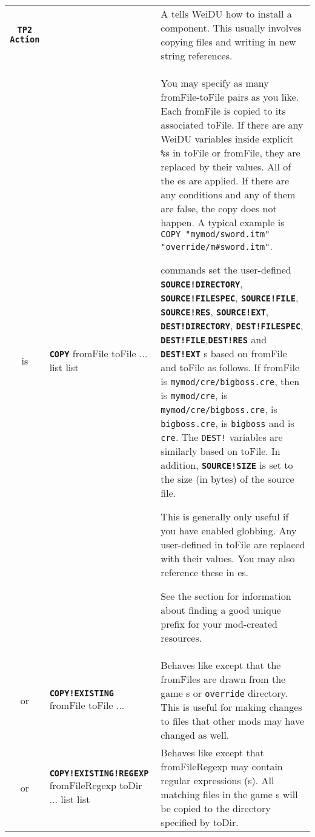 \documentclass{article}
\def\ttref#1{\ahrefloc{#1}{\tt #1}}
\def\DEFINE#1{{\tt \bf #1}\label{#1}\index{#1}}
\def\t#1{{\tt #1}}
\def\Slist{{\color{red} list }}
\begin{document}
\begin{tabular}{cp{10in}|p{10in}}
\DEFINE{TP2 Action} & & 
  A \ttref{TP2 Action} tells WeiDU how to install a component. This usually
  involves copying files and writing in new string references. \\

  is & \DEFINE{COPY} \ttref{optNoBackup} 
                     \ttref{optGlob} fromFile toFile ...
       \ttref{patch} \Slist
       \ttref{when} \Slist &
       You may specify as many fromFile-toFile pairs as you like. Each
       fromFile is copied to its associated toFile. If there are any WeiDU
       variables inside explicit \t{\%}s in toFile or fromFile, they are
       replaced by their values. All of the
       \ttref{patch}es are applied. If there are any \ttref{when}
       conditions and any of them are false, the copy does not happen. 
       A typical example is \t{COPY "mymod/sword.itm"
       "override/m\#sword.itm"}.
       

       \ttref{COPY} commands set the user-defined \DEFINE{SOURCE!DIRECTORY},
       \DEFINE{SOURCE!FILESPEC}, \DEFINE{SOURCE!FILE},
       \DEFINE{SOURCE!RES}, \DEFINE{SOURCE!EXT},
       \DEFINE{DEST!DIRECTORY}, \DEFINE{DEST!FILESPEC},
       \DEFINE{DEST!FILE},\DEFINE{DEST!RES} and \DEFINE{DEST!EXT}
       \ttref{variable}s based on fromFile and toFile as follows. If
       fromFile is \t{mymod/cre/bigboss.cre}, then
       \ttref{SOURCE!DIRECTORY} is \t{mymod/cre},
       \ttref{SOURCE!FILESPEC} is \t{mymod/cre/bigboss.cre},
       \ttref{SOURCE!FILE} is \t{bigboss.cre},
       \ttref{SOURCE!RES} is \t{bigboss} and \ttref{SOURCE!EXT} is \t{cre}.
       The \t{DEST!} variables
       are similarly based on toFile. In addition, \DEFINE{SOURCE!SIZE} is
       set to the size (in bytes) of the source file.


       This is generally only useful if you have enabled globbing. Any
       user-defined \ttref{variables} in toFile are replaced with their
       values. You may also reference these \ttref{variables} in
       \ttref{patch}es.


       See the \ttref{Module Distribution} section for information about
       finding a good unique prefix for your mod-created resources.
       \\
  or & \DEFINE{COPY!EXISTING} \ttref{optNoBackup} fromFile toFile ...
        &
       Behaves like \ttref{COPY} except that the fromFiles are drawn from
       the game \ttref{BIFF}s or \t{override} directory. This is useful for
       making changes to files that other mods may have changed as well.
       \\
  or & \DEFINE{COPY!EXISTING!REGEXP} \ttref{optNoBackup} \ttref{optGlob} fromFileRegexp toDir ...
       \ttref{patch} \Slist
       \ttref{when} \Slist &
       Behaves like \ttref{COPY!EXISTING} except that fromFileRegexp may
       contain regular expressions (\ttref{regexp}s). All matching files in
       the game \ttref{BIFF}s will be copied to the directory specified by
       toDir.



\end{tabular}
\end{document}
